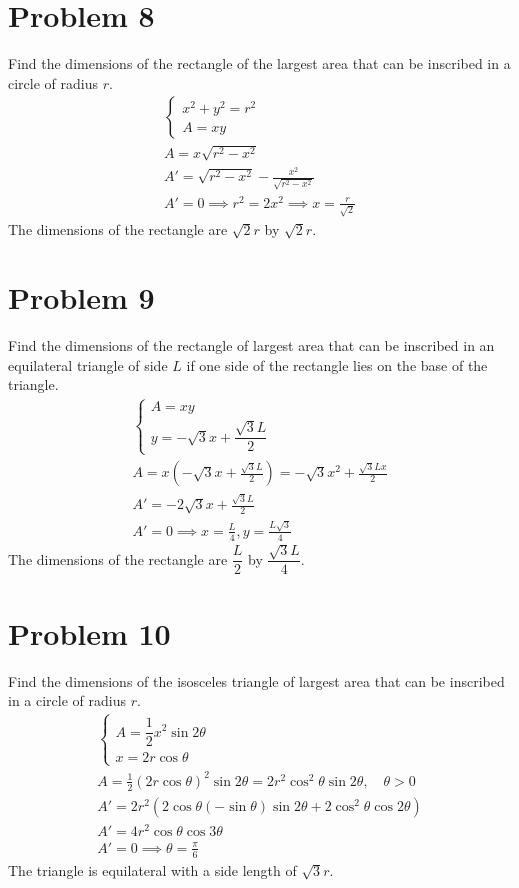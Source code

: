 \documentclass[12pt]{article}
\newcommand{\problem}[1]{\section{Problem #1}}
\begin{document}
\problem{8}
Find the dimensions of the rectangle of the largest area that can be inscribed in a circle of radius $r$.
\begin{gather*}
    \begin{cases}
        x^2+y^2=r^2\\
        A=xy
    \end{cases}\\
    A=x\sqrt{r^2-x^2}\\
    A'=\sqrt{r^2-x^2}-\frac{x^2}{\sqrt{r^2-x^2}}\\
    A'=0 \implies r^2=2x^2 \implies \boxed{x=\frac{r}{\sqrt{2}}}
\end{gather*}
The dimensions of the rectangle are $\sqrt{2}r$ by $\sqrt{2}r$.

\problem{9}
Find the dimensions of the rectangle of largest area that can be inscribed in an equilateral triangle of
side $L$ if one side of the rectangle lies on the base of the triangle.
\begin{gather*}
    \begin{cases}
        A=xy\\
        y=-\sqrt{3}x+\dfrac{\sqrt{3}L}{2}
    \end{cases}\\
    A=x(-\sqrt{3}x+\frac{\sqrt{3}L}{2})=-\sqrt{3}x^2+\frac{\sqrt{3}Lx}{2}\\
    A'=-2\sqrt{3}x+\frac{\sqrt{3}L}{2}\\
    A'=0 \implies \boxed{x=\frac{L}{4},y=\frac{L\sqrt{3}}{4}}
\end{gather*}
The dimensions of the rectangle are $\dfrac{L}{2}$ by $\dfrac{\sqrt{3}L}{4}$.

\problem{10}
Find the dimensions of the isosceles triangle of largest area that can be inscribed in a circle of radius $r$.
\begin{gather*}
    \begin{cases}
        A=\dfrac{1}{2}x^2 \sin 2\theta\\
        x=2r \cos \theta
    \end{cases}\\
    A=\frac{1}{2}(2r\cos \theta )^2\sin 2\theta=2r^2 \cos^2 \theta \sin 2\theta, \quad \theta >0\\
    A'=2r^2(2\cos \theta (- \sin \theta)\sin 2\theta + 2\cos^2 \theta \cos 2\theta )\\
    A'=4r^2\cos \theta \cos 3\theta \\
    A'=0 \implies \boxed{\theta =\frac{\pi}{6}}
\end{gather*}
The triangle is equilateral with a side length of $\sqrt{3}r$.
\end{document}
